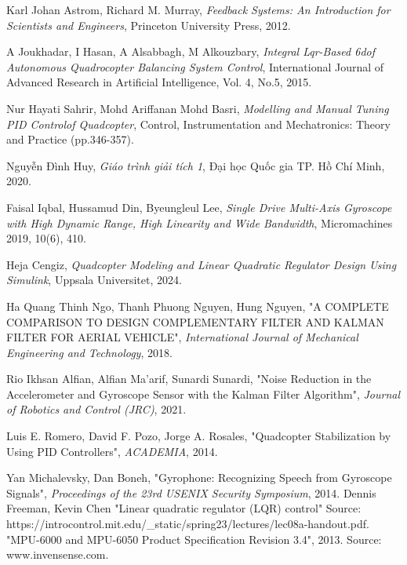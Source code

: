 \begin{thebibliography}{99}

 Karl Johan Astrom, Richard M. Murray, \emph{Feedback Systems: An Introduction for Scientists and Engineers}, Princeton University Press, 2012.

 A Joukhadar, I Hasan, A Alsabbagh, M Alkouzbary, \emph{Integral Lqr-Based 6dof Autonomous Quadrocopter Balancing System Control}, International Journal of Advanced Research in Artificial Intelligence, Vol. 4, No.5, 2015.

 Nur Hayati Sahrir, Mohd Ariffanan Mohd Basri, \emph{Modelling and Manual Tuning PID Controlof Quadcopter}, Control, Instrumentation and Mechatronics: Theory and Practice (pp.346-357).

 Nguyễn Đình Huy, \emph{Giáo trình giải tích 1}, Đại học Quốc gia TP. Hồ Chí Minh, 2020.

 Faisal Iqbal, Hussamud Din, Byeungleul Lee, \emph{Single Drive Multi-Axis Gyroscope with High Dynamic Range, High Linearity and Wide Bandwidth}, Micromachines 2019, 10(6), 410.

 Heja Cengiz, \emph{Quadcopter Modeling and Linear Quadratic Regulator Design Using Simulink}, Uppsala Universitet, 2024.

 Ha Quang Thinh Ngo, Thanh Phuong Nguyen, Hung Nguyen, "A COMPLETE COMPARISON TO DESIGN COMPLEMENTARY FILTER AND KALMAN FILTER FOR AERIAL VEHICLE", \emph{International Journal of Mechanical Engineering and Technology}, 2018.

 Rio Ikhsan Alfian, Alfian Ma'arif, Sunardi Sunardi, "Noise Reduction in the Accelerometer and Gyroscope Sensor with the Kalman Filter Algorithm", \emph{Journal of Robotics and Control (JRC)}, 2021.

 Luis E. Romero, David F. Pozo, Jorge A. Rosales, "Quadcopter Stabilization by Using PID Controllers", \emph{ACADEMIA}, 2014.

 Yan Michalevsky, Dan Boneh, "Gyrophone: Recognizing Speech from Gyroscope Signals", \emph{Proceedings of the 23rd USENIX Security Symposium}, 2014.
 Dennis Freeman, Kevin Chen "Linear quadratic regulator (LQR) control" Source: https://introcontrol.mit.edu/\_static/spring23/lectures/lec08a-handout.pdf.
 "MPU-6000 and MPU-6050 Product Specification Revision 3.4", 2013. Source: www.invensense.com.


\end{thebibliography}
